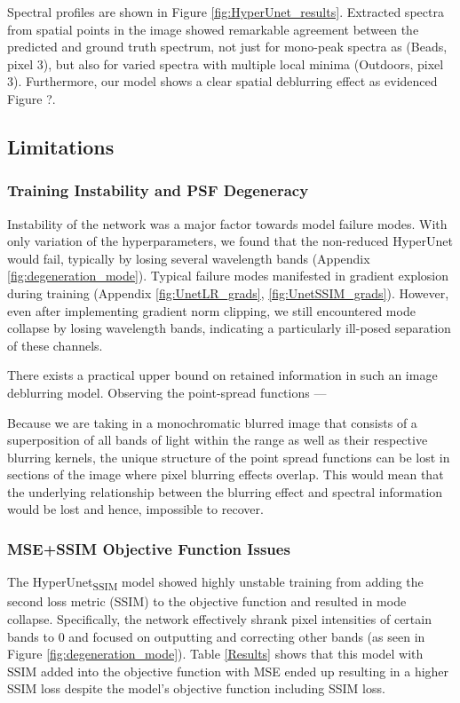 \documentclass{article}
\begin{document}
Spectral profiles are shown in Figure \ref{fig:HyperUnet_results}. Extracted spectra from spatial points in the image showed remarkable agreement between the predicted and ground truth spectrum, not just for mono-peak spectra as (Beads, pixel 3), but also for varied spectra with multiple local minima (Outdoors, pixel 3). Furthermore, our model shows a clear spatial deblurring effect as evidenced Figure ?.

\subsection{Limitations}
\subsubsection{Training Instability and PSF Degeneracy}
Instability of the network was a major factor towards model failure modes. With only variation of the hyperparameters, we found that the non-reduced HyperUnet would fail, typically by losing several wavelength bands (Appendix \ref{fig:degeneration_mode}). Typical failure modes manifested in gradient explosion during training (Appendix \ref{fig:UnetLR_grads}, \ref{fig:UnetSSIM_grads}). However, even after implementing gradient norm clipping, we still encountered mode collapse by losing wavelength bands, indicating a particularly ill-posed separation of these channels.

There exists a practical upper bound on retained information in such an image deblurring model. Observing the point-spread functions ---


Because we are taking in a monochromatic blurred image that consists of a superposition of all bands of light within the range as well as their respective blurring kernels, the unique structure of the point spread functions can be lost in sections of the image where pixel blurring effects overlap. This would mean that the underlying relationship between the blurring effect and spectral information would be lost and hence, impossible to recover.


\subsubsection{MSE+SSIM Objective Function Issues} 
The HyperUnet\textsubscript{SSIM} model showed highly unstable training from adding the second loss metric (SSIM) to the objective function and resulted in mode collapse. Specifically, the network effectively shrank pixel intensities of certain bands to $0$ and focused on outputting and correcting other bands (as seen in Figure \ref{fig:degeneration_mode}). Table \ref{Results} shows that this model with SSIM added into the objective function with MSE ended up resulting in a higher SSIM loss despite the model's objective function including SSIM loss.
\end{document}
